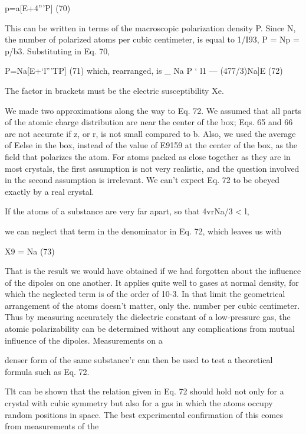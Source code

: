 {{\begin{equation}
\end{equation}
p=a[E+4'''P] (70)

This can be written in terms of the macroscopic polarization density
P. Since N, the number of polarized atoms per cubic centimeter, is
equal to 1/I93, P = Np = p/b3. Substituting in Eq. 70,

\begin{equation}
\end{equation}
P=Na[E+‘l'''TP] (71)
which, rearranged, is
_ Na
P ‘ l1  ---  (477/3)Na]E (72)

The factor in brackets must be the electric susceptibility Xe.

We made two approximations along the way to Eq. 72. We assumed
that all parts of the atomic charge distribution are near the
center of the box; Eqs. 65 and 66 are not accurate if z, or r, is not
small compared to b. Also, we used the average of Eelse in the box,
instead of the value of E9159 at the center of the box, as the field that
polarizes the atom. For atoms packed as close together as they are
in most crystals, the first assumption is not very realistic, and the
question involved in the second assumption is irrelevant. We can't
expect Eq. 72 to be obeyed exactly by a real crystal.

If the atoms of a substance are very far apart, so that 4vrNa/3 < l,

we can neglect that term in the denominator in Eq. 72, which leaves
us with

\begin{equation}
\end{equation}
X9 = Na (73)

That is the result we would have obtained if we had forgotten about
the influence of the dipoles on one another. It applies quite well to
gases at normal density, for which the neglected term is of the order
of 10-3. In that limit the geometrical arrangement of the atoms
doesn't matter, only the. number per cubic centimeter. Thus by
measuring accurately the dielectric constant of a low-pressure gas,
the atomic polarizability can be determined without any complications
from mutual influence of the dipoles. Measurements on a

denser form of the same substance'r can then be used to test a theoretical
formula such as Eq. 72.

Tlt can be shown that the relation given in Eq. 72 should hold not only for a crystal
with cubic symmetry but also for a gas in which the atoms occupy random positions in
space. The best experimental confirmation of this comes from measurements of the

}}
